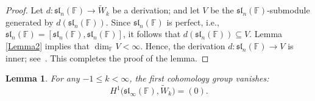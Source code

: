 \documentclass[12pt,a4paper]{amsart}
\theoremstyle{plain}
\newtheorem{Lemma}{Lemma}
\begin{document}
	
	\begin{proof}  Let $d: \mathfrak{sl}_n(\mathbb{F}) \to \widetilde{W}_k$ be a derivation; and  let $V$ be the $\mathfrak{sl}_n(\mathbb{F})$-submodule generated by $d(\mathfrak{sl}_n(\mathbb{F}))$. Since $\mathfrak{sl}_n(\mathbb{F})$ is perfect, i.e.,  $\mathfrak{sl}_n(\mathbb{F}) = [\mathfrak{sl}_n(\mathbb{F}) , \mathfrak{sl}_n(\mathbb{F})]$, it follows that $d(\mathfrak{sl}_n(\mathbb{F})) \subseteq V$. Lemma \ref{Lemma2} implies that $\dim_{\mathbb{F}} V < \infty$. Hence, the derivation $d: \mathfrak{sl}_n(\mathbb{F}) \to V$ is inner; see~\cite{Jacobson_PBW}. This completes the proof of the lemma. \end{proof}
	
	\begin{Lemma}\label{Lemma5} For any $-1 \leq k < \infty$, the first cohomology group vanishes: $$H^1\big(\mathfrak{sl}_{\infty}(\mathbb{F}), \widetilde{W}_k\big) = (0).$$\end{Lemma}
	
\end{document}
